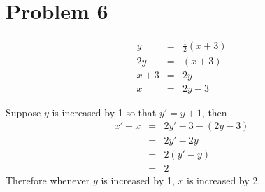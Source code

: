 \section*{Problem 6}
\begin{eqnarray*}
    y &=& \frac{1}{2}(x + 3) \\
   2y &=& (x + 3) \\
x + 3 &=& 2y \\
    x &=& 2y - 3
\end{eqnarray*}

Suppose $ y $ is increased by 1 so that $ y' = y + 1 $, then
\begin{eqnarray*}
  x' - x &=& 2y' - 3 - (2y - 3) \\
         &=& 2y' - 2y \\
         &=& 2(y' - y) \\
         &=& 2
\end{eqnarray*}
Therefore whenever $ y $ is increased by 1, $ x $ is increased by 2.
